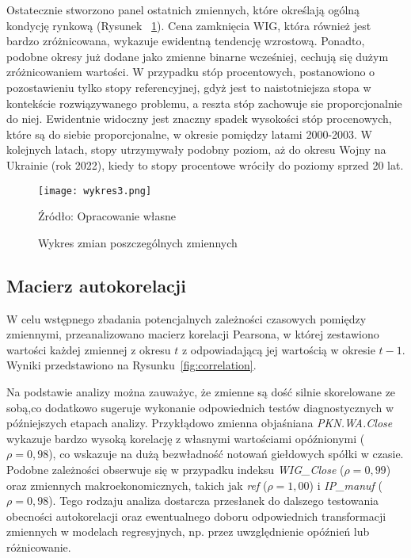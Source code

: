\documentclass[12pt, twoside]{article}
\begin{document}
Ostatecznie stworzono panel ostatnich zmiennych, które określają ogólną kondycję rynkową (Rysunek ~\ref{fig:WIG}). Cena zamknięcia WIG, która również jest bardzo zróżnicowana, wykazuje ewidentną tendencję wzrostową. Ponadto, podobne okresy już dodane jako zmienne binarne wcześniej, cechują się dużym zróżnicowaniem wartości. W przypadku stóp procentowych, postanowiono o pozostawieniu tylko stopy referencyjnej, gdyż jest to naistotniejsza stopa w kontekście rozwiązywanego problemu, a reszta stóp zachowuje sie proporcjonalnie do niej. Ewidentnie widoczny jest znaczny spadek wysokości stóp procenowych, które są do siebie proporcjonalne, w okresie pomiędzy latami 2000-2003. W kolejnych latach, stopy utrzymywały podobny poziom, aż do okresu Wojny na Ukrainie (rok 2022), kiedy to stopy procentowe wróciły do poziomy sprzed 20 lat.  

\begin{figure}[H]
    \centering
    \texttt{[image: wykres3.png]}
    \caption{Wykres zmian poszczególnych zmiennych}
    \label{fig:WIG}
    \vspace{0.1cm}
    {\parbox[t]{\linewidth}{\raggedright Źródło: Opracowanie własne}}

\end{figure}



\subsection*{Macierz autokorelacji}

W celu wstępnego zbadania potencjalnych zależności czasowych pomiędzy zmiennymi, przeanalizowano macierz korelacji Pearsona, w której zestawiono wartości każdej zmiennej z okresu $t$ z odpowiadającą jej wartością w okresie $t-1$. Wyniki przedstawiono na Rysunku~\ref{fig:correlation}.

Na podstawie analizy można zauważyc, że zmienne są dość silnie skorelowane ze sobą,co dodatkowo sugeruje wykonanie odpowiednich testów diagnostycznych w późniejszych etapach analizy. Przykłądowo zmienna objaśniana 
\textit{PKN.WA.Close} wykazuje bardzo wysoką korelację z własnymi wartościami opóźnionymi ($\rho = 0{,}98$), co wskazuje na dużą bezwładność notowań giełdowych spółki w czasie. Podobne zależności obserwuje się w przypadku indeksu \textit{WIG\_Close} ($\rho = 0{,}99$) oraz zmiennych makroekonomicznych, takich jak \textit{ref} ($\rho = 1{,}00$) i \textit{IP\_manuf} ($\rho = 0{,}98$). Tego rodzaju analiza dostarcza przesłanek do dalszego testowania obecności autokorelacji oraz ewentualnego doboru odpowiednich transformacji zmiennych w modelach regresyjnych, np. przez uwzględnienie opóźnień lub różnicowanie.
\end{document}
